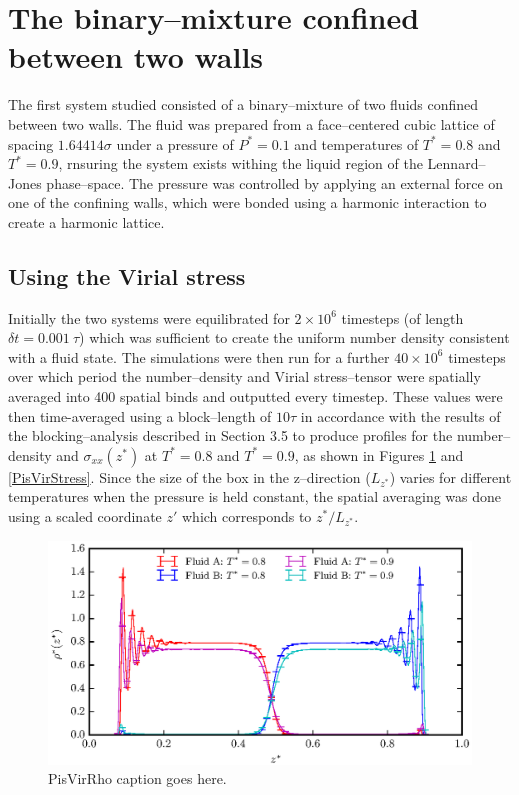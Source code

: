 \section{The binary--mixture confined between two walls}
The first system studied consisted of a binary--mixture of two fluids confined between two walls.
The fluid was prepared from a face--centered cubic lattice of spacing $1.64414 \sigma$ under a pressure of $P^{*} = 0.1$ and temperatures of $T^{*} = 0.8$ and $T^{*} = 0.9$, rnsuring the system exists withing the liquid region of the Lennard--Jones phase--space.\cite{Smit}
The pressure was controlled by applying an external force on one of the confining walls, which were bonded using a harmonic interaction to create a harmonic lattice.

\subsection{Using the Virial stress}
Initially the two systems were equilibrated for $2 \times 10^{6}$ timesteps (of length $\delta t = 0.001\ \tau$) which was sufficient to create the uniform number density consistent with a fluid state.
The simulations were then run for a further $40 \times 10^{6}$ timesteps over which period the number--density and Virial stress--tensor were spatially averaged into 400 spatial binds and outputted every timestep.
These values were then time-averaged using a block--length of $10 \tau$ in accordance with the results of the blocking--analysis described in Section 3.5 to produce profiles for the number--density and $\sigma_{xx}(z^{*})$ at $T^{*} = 0.8$ and $T^{*} = 0.9$, as shown in Figures \ref{PisVirRho} and \ref{PisVirStress}. 
Since the size of the box in the z--direction ($L_{z^{*}}$) varies for different temperatures when the pressure is held constant, the spatial averaging was done using a scaled coordinate $z'$ which corresponds to $z^{*} / L_{z^{*}}$.

\FloatBarrier
\begin{figure}[h]
\centering
\includegraphics[scale=0.8]{PisVirRho}
\caption{PisVirRho caption goes here.}
\label{PisVirRho}
\end{figure}

